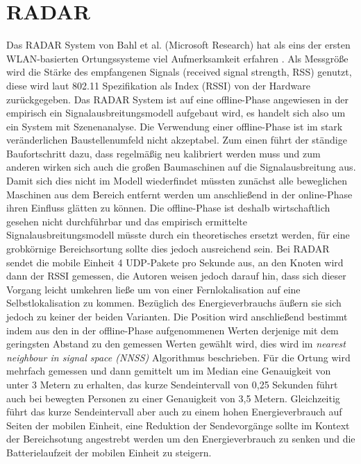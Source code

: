 \section{RADAR}
\label{ch:Vorherige:sec:RADAR}
Das RADAR System von Bahl et al. (Microsoft Research) hat als eins der ersten WLAN-basierten Ortungssysteme viel Aufmerksamkeit erfahren \cite{bahl2000radar}.
Als Messgröße wird die Stärke des empfangenen Signals (received signal strength, RSS) genutzt, diese wird laut 802.11 Spezifikation als Index (RSSI) von der Hardware zurückgegeben. 
Das RADAR System ist auf eine offline-Phase angewiesen in der empirisch ein Signalausbreitungsmodell aufgebaut wird, es handelt sich also um ein System mit Szenenanalyse.
Die Verwendung einer offline-Phase ist im stark veränderlichen Baustellenumfeld nicht akzeptabel. 
Zum einen führt der ständige Baufortschritt dazu, dass regelmäßig neu kalibriert werden muss und zum anderen wirken sich auch die großen Baumaschinen auf die Signalausbreitung aus. 
Damit sich dies nicht im Modell wiederfindet müssten zunächst alle beweglichen Maschinen aus dem Bereich entfernt werden um anschließend in der online-Phase ihren Einfluss glätten zu können.
Die offline-Phase ist deshalb wirtschaftlich gesehen nicht durchführbar und das empirisch ermittelte Signalausbreitungsmodell müsste durch ein theoretisches ersetzt werden, für eine grobkörnige Bereichsortung sollte dies jedoch ausreichend sein.
Bei RADAR sendet die mobile Einheit 4 UDP-Pakete pro Sekunde aus, an den Knoten wird dann der RSSI gemessen, die Autoren weisen jedoch darauf hin, dass sich dieser Vorgang leicht umkehren ließe um von einer Fernlokalisation auf eine Selbstlokalisation zu kommen.
Bezüglich des Energieverbrauchs äußern sie sich jedoch zu keiner der beiden Varianten.
Die Position wird anschließend bestimmt indem aus den in der offline-Phase aufgenommenen Werten derjenige mit dem geringsten Abstand zu den gemessen Werten gewählt wird, dies wird im \textit{nearest neighbour in signal space (NNSS)} Algorithmus beschrieben.
Für die Ortung wird mehrfach gemessen und dann gemittelt um im Median eine Genauigkeit von unter 3 Metern zu erhalten, das kurze Sendeintervall von 0,25 Sekunden führt auch bei bewegten Personen zu einer Genauigkeit von 3,5 Metern.
Gleichzeitig führt das kurze Sendeintervall aber auch zu einem hohen Energieverbrauch auf Seiten der mobilen Einheit, eine Reduktion der Sendevorgänge sollte im Kontext der Bereichsotung angestrebt werden um den Energieverbrauch zu senken und die Batterielaufzeit der mobilen Einheit zu steigern.

